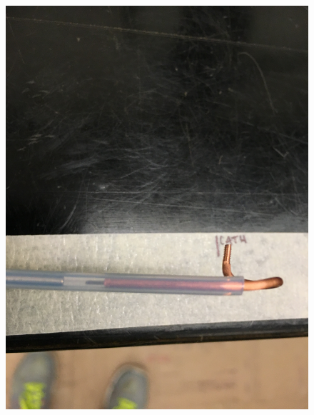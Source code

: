 \begin{figure}[htbp]
    \begin{minipage}{0.47\textwidth}
    \includegraphics[width=\linewidth]{figures/testbed/ft5_3.jpg}
    \end{minipage}
    \hspace{\fill} %
    \begin{minipage}{0.47\textwidth}

\end{minipage}
\end{figure}

